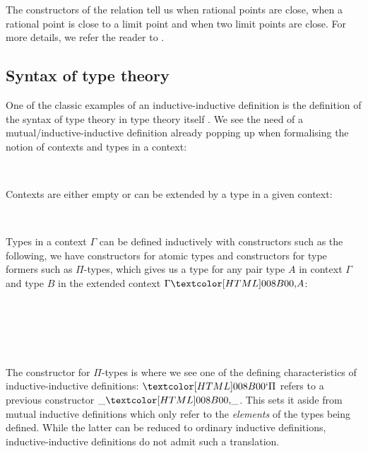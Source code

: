 %
The constructors of the relation tell us when rational points are
close, when a rational point is close to a limit point and when two
limit points are close. For more details, we refer the reader to
\cite{UFP2013}.

\subsection{Syntax of type theory}
\label{syntax-of-type-theory}

One of the classic examples of an inductive-inductive definition
\cite{NordvallForsberg2013} is the definition of the syntax of type
theory in type theory itself \cite{Danielsson2006}
\cite{Chapman2009}. We see the need of a mutual/inductive-inductive
definition already popping up when formalising the notion of contexts
and types in a context:
%
\begin{sorts}
  \sortnamety{\ttconty}{\Set} \\
  \sortnamety{\tttyty}{\ttconty \to \Set}
\end{sorts}
%
Contexts are either empty or can be extended by a type in a given
context:
%
\begin{datatype}{\ttconty}{}
  \constr{\ttnil}{\ttconty} \\
  \constr{\ttcons{\_}{\_}}{(\Gamma : \ttconty) \to \tttyty\ \Gamma \to \ttconty}
\end{datatype}
%
Types in a context $\Gamma$ can be defined inductively with
constructors such as the following, \ie we have constructors for
atomic types and constructors for type formers such as $\Pi$-types,
which gives us a type for any pair type $A$ in context $\Gamma$ and
type $B$ in the extended context $\ttcons{\Gamma}{A}$:
%
\begin{datatype}{\tttyty}{}
  \constr{\ttzero}{(\Gamma : \ttconty) \to \tttyty\ \Gamma} \\
  \constr{\ttone}{(\Gamma : \ttconty) \to \tttyty\ \Gamma} \\
  \constrdots \\
   \\
  \constrdots
\end{datatype}
%
The constructor for $\Pi$-types is where we see one of the defining
characteristics of inductive-inductive definitions: $\ttpi$ refers to
a previous constructor $\ttcons{\_}{\_}$. This sets it aside from
mutual inductive definitions which only refer to the \emph{elements}
of the types being defined. While the latter can be reduced to
ordinary inductive definitions, inductive-inductive definitions do not
admit such a translation.

